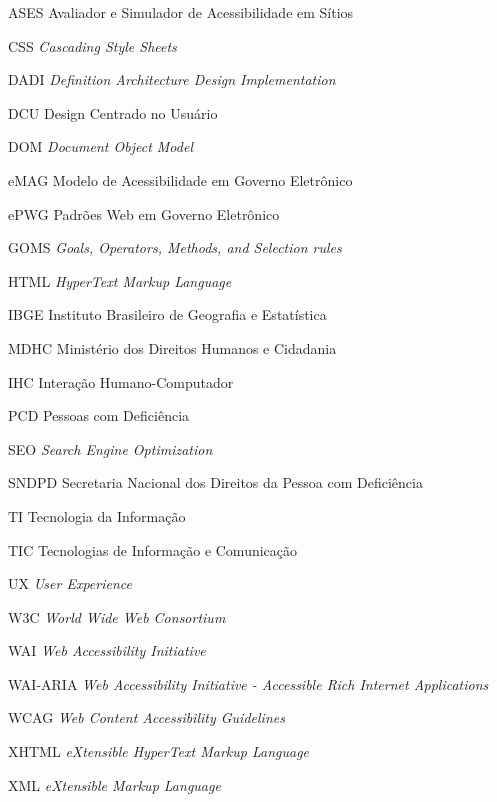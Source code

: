 \documentclass[
  12pt,
  openright,
  twoside,
  a4paper,
  english,
  french,
  spanish,
  brazil
]{abntex2}
\begin{document}
\begin{siglas}
  \item[ASES] Avaliador e Simulador de Acessibilidade em Sítios
  \item[CSS] \textit{Cascading Style Sheets}
  \item[DADI] \textit{Definition Architecture Design Implementation}
  \item[DCU] Design Centrado no Usuário
  \item[DOM] \textit{Document Object Model}
  \item[eMAG] Modelo de Acessibilidade em Governo Eletrônico
  \item[ePWG] Padrões Web em Governo Eletrônico
  \item[GOMS] \textit{Goals, Operators, Methods, and Selection rules}
  \item[HTML] \textit{HyperText Markup Language}
  \item[IBGE] Instituto Brasileiro de Geografia e Estatística
  \item[MDHC] Ministério dos Direitos Humanos e Cidadania
  \item[IHC] Interação Humano-Computador
  \item[PCD] Pessoas com Deficiência
  \item[SEO] \textit{Search Engine Optimization}
  \item[SNDPD] Secretaria Nacional dos Direitos da Pessoa com Deficiência
  \item[TI] Tecnologia da Informação
  \item[TIC] Tecnologias de Informação e Comunicação
  \item[UX] \textit{User Experience}
  \item[W3C] \textit{World Wide Web Consortium}
  \item[WAI] \textit{Web Accessibility Initiative}
  \item[WAI-ARIA]
    \textit{
      Web Accessibility Initiative - Accessible Rich Internet Applications
    }
  \item[WCAG] \textit{Web Content Accessibility Guidelines}
  \item[XHTML] \textit{eXtensible HyperText Markup Language}
  \item[XML] \textit{eXtensible Markup Language}
\end{siglas}
\end{document}
